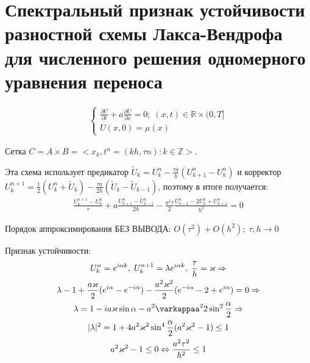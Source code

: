 \documentclass[__main__.tex]{subfiles}
\begin{document}
\section{Спектральный признак устойчивости разностной схемы Лакса-Вендрофа для численного решения одномерного уравнения переноса}

\begin{gather*}
	\begin{cases}
	\frac{\partial U}{\partial t}+a\frac{\partial U}{\partial x}=0;\; (x,t)\in\mathbb{R}\times(0,T]\\
	U(x,0)=\mu(x)
	\end{cases}
\end{gather*}

Сетка $C=A\times B=<x_k,t^n=(kh,\tau n):k\in\mathbb{Z}>.$

Эта схема использует предикатор $\tilde{U}_k=U_k^n-\frac{\tau a}{h}(U_{k+1}^n-U_k^n)$ и корректор $U_k^{n+1}=\frac{1}{2}(U_k^n+\tilde{U}_k)-\frac{\tau a}{2h}(\tilde{U}_k-\tilde{U}_{k-1})$, поэтому в итоге получается:
\begin{gather*}
\frac{U_k^{n+1}-U_k^n}{\tau}+a\frac{U_{k+1}^n-U_{k-1}^n}{2h}-\frac{a^2\tau}{2}\frac{U_{k-1}^n-2U_k^n+U_{k+1}^n}{h^2}=0
\end{gather*}

Порядок аппроксимирования БЕЗ ВЫВОДА: $O(\tau^2)+O(h^2);\;\tau,h\rightarrow0$

Признак устойчивости:
\begin{gather*}
	U_k^n=e^{i\alpha k},\;U_k^{n+1}=\lambda e^{i\alpha k},\; \frac{\tau}{h}=\varkappa\Rightarrow\\
	\lambda-1+\frac{a\varkappa}{2}(e^{i\alpha}-e^{-i\alpha})-\frac{a^2\varkappa^2}{2}(e^{-i\alpha}-2+e^{i\alpha})=0\Rightarrow\\
	\lambda=1-ia\varkappa\sin\alpha-a^2\varkappaa^22\sin^2\frac{\alpha}{2}\Rightarrow\\
	|\lambda|^2=1+4a^2\varkappa^2\sin^4\frac{\alpha}{2}(a^2\varkappa^2-1)\le 1\\
	a^2\varkappa^2-1\le 0\Leftrightarrow \frac{a^2\tau^2}{h^2}\le 1
\end{gather*}
\end{document}
